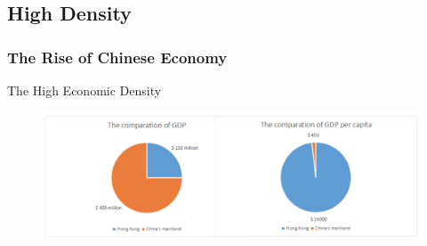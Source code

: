\documentclass[slidestop,uncompress,mathsans, 12pt]{beamer}
\begin{document}
\subsection{High Density}
\begin{frame}
\frametitle{The Rise of Chinese Economy}
The High Economic Density\\
\bigskip
\bigskip
\begin{figure}[h]
\raggedleft
\includegraphics[width=1\textwidth]{hk5.jpg}
\label{threadsVsSync}
\end{figure}
\end{frame}
\end{document}
